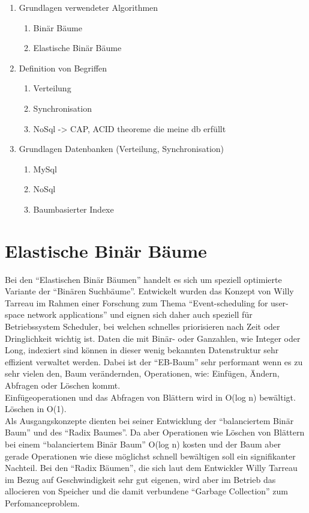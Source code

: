 \documentclass[a4paper,11pt,oneside,%
headsepline,												%
footsepline,												%
bibtotocnumbered									%
]{scrreprt}
\begin{document}
	\begin{enumerate}[1.]
			\item Grundlagen verwendeter Algorithmen
				\begin{enumerate}[1.]
					\item Binär Bäume
					\item Elastische Binär Bäume
				\end{enumerate}
			\item Definition von Begriffen
				\begin{enumerate}[1.]
					\item Verteilung
					\item Synchronisation
					\item NoSql -> CAP, ACID theoreme die meine db erfüllt 
				\end{enumerate}
			\item Grundlagen Datenbanken (Verteilung, Synchronisation)
				\begin{enumerate}[1.]
					\item MySql
					\item NoSql 
					\item Baumbasierter Indexe
				\end{enumerate}
	\end{enumerate}

\section{Elastische Binär Bäume}
\label{sec:ebTreeGrundlagen}
Bei den \enquote{Elastischen Binär Bäumen} handelt es sich um speziell optimierte Variante der \enquote{Binären Suchbäume}. Entwickelt wurden das Konzept von Willy Tarreau\autocite{Tarreau} im Rahmen einer Forschung zum Thema \enquote{Event-scheduling for user-space network applications} und eignen sich daher auch speziell für Betriebssystem Scheduler, bei welchen schnelles priorisieren nach Zeit oder Dringlichkeit wichtig ist. Daten die mit Binär- oder Ganzahlen, wie Integer oder Long, indexiert sind können in dieser wenig bekannten Datenstruktur sehr effizient verwaltet werden. Dabei ist der \enquote{\ac{EB-Baum}} sehr performant wenn es zu sehr vielen den, Baum verändernden, Operationen, wie: Einfügen, Ändern, Abfragen oder Löschen kommt.\\
Einfügeoperationen und das Abfragen von Blättern wird in O(log n) bewältigt. Löschen in O(1).\\

Als Ausgangskonzepte dienten bei seiner Entwicklung der \enquote{balanciertem Binär Baum} und des \enquote{Radix Baumes}. Da aber Operationen wie Löschen von Blättern bei einem \enquote{balanciertem Binär Baum} O(log n) kosten und der Baum aber gerade Operationen wie diese möglichst schnell bewältigen soll ein signifikanter Nachteil. Bei den \enquote{Radix Bäumen}, die sich laut dem Entwickler Willy Tarreau\autocite[Absatz Introduction]{Tarreau} im Bezug auf Geschwindigkeit sehr gut eigenen, wird aber im Betrieb das allocieren von Speicher und die damit verbundene \enquote{Garbage Collection} zum Perfomanceproblem.\\
\end{document}
